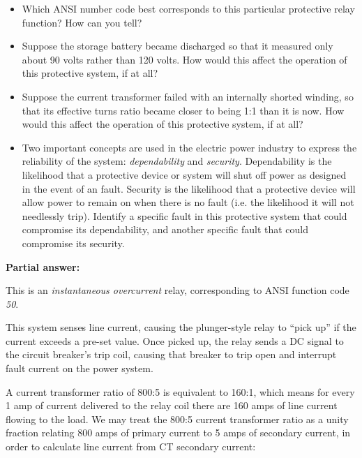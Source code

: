 \begin{itemize}
\item{} Which ANSI number code best corresponds to this particular protective relay function?  How can you tell?
\item{} Suppose the storage battery became discharged so that it measured only about 90 volts rather than 120 volts.  How would this affect the operation of this protective system, if at all?
\item{} Suppose the current transformer failed with an internally shorted winding, so that its effective turns ratio became closer to being 1:1 than it is now.  How would this affect the operation of this protective system, if at all?
\item{} Two important concepts are used in the electric power industry to express the reliability of the system: {\it dependability} and {\it security}.  Dependability is the likelihood that a protective device or system will shut off power as designed in the event of an fault.  Security is the likelihood that a protective device will allow power to remain on when there is no fault (i.e. the likelihood it will not needlessly trip).  Identify a specific fault in this protective system that could compromise its dependability, and another specific fault that could compromise its security.
\end{itemize}







\noindent
{\bf Partial answer:}

\vskip 10pt

This is an {\it instantaneous overcurrent} relay, corresponding to ANSI function code {\it 50}.
 






This system senses line current, causing the plunger-style relay to ``pick up'' if the current exceeds a pre-set value.  Once picked up, the relay sends a DC signal to the circuit breaker's trip coil, causing that breaker to trip open and interrupt fault current on the power system.

\vskip 10pt

A current transformer ratio of 800:5 is equivalent to 160:1, which means for every 1 amp of current delivered to the relay coil there are 160 amps of line current flowing to the load.  We may treat the 800:5 current transformer ratio as a unity fraction relating 800 amps of primary current to 5 amps of secondary current, in order to calculate line current from CT secondary current:

